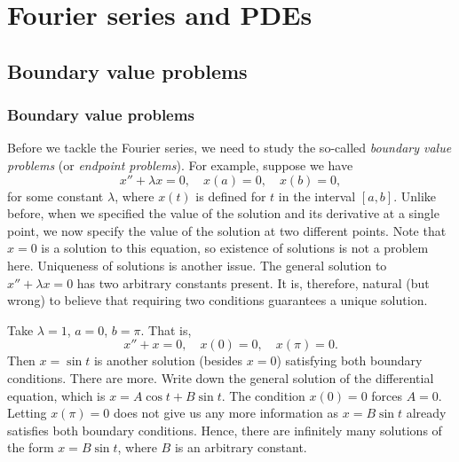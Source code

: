 \chapter{Fourier series and PDEs} \label{FS:chapter}


\section{Boundary value problems} \label{bvp:section}


\subsection{Boundary value problems}

Before we tackle the Fourier series, we need to study
the so-called 
\emph{boundary value problems}
(or \emph{endpoint problems}).  For example,
suppose we have
\begin{equation*}
x'' + \lambda x = 0, \quad x(a) = 0, \quad x(b) = 0,
\end{equation*}
for some constant $\lambda$, where $x(t)$ is defined for $t$ in the interval
$[a,b]$.
Unlike before, when we specified the value of the solution and its derivative
at a single point, we now specify the value of the solution at two different
points.  Note that $x=0$ is a solution to this equation, so existence of
solutions is not a problem here.  Uniqueness of solutions is another issue.
The general solution to $x'' + \lambda x = 0$ has two
arbitrary constants present.  It is, therefore,
natural (but wrong) to believe that requiring two
conditions guarantees a unique solution.

\begin{example}
Take $\lambda = 1$,
$a=0$, $b=\pi$.  That is,
\begin{equation*}
x'' + x = 0, \quad x(0) = 0, \quad x(\pi) = 0.
\end{equation*}
Then $x = \sin t$ is another solution (besides $x=0$) satisfying both boundary
conditions.  There are more.  Write down the general
solution of the differential equation, which is $x= A \cos t + B \sin t$.
The condition $x(0) = 0$ forces $A=0$.  Letting $x(\pi) = 0$ does not
give us any more information as $x = B \sin t$ already satisfies both
boundary conditions.
Hence, there are infinitely many solutions of the form $x = B \sin t$,
where $B$ is an arbitrary constant.
\end{example}

